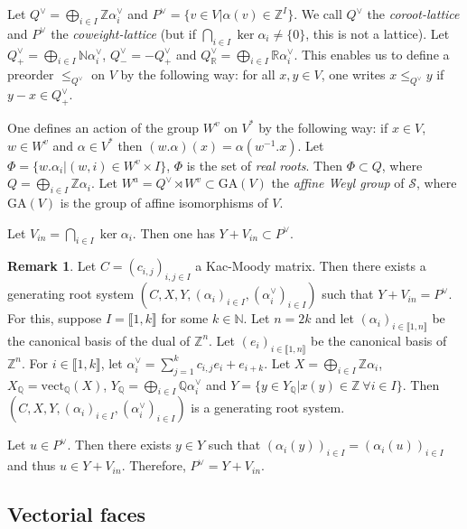 \documentclass[12pt]{article}
\theoremstyle{plain}
\theoremstyle{definition}
\newtheorem{rque}[thm]{Remark}
\newcommand{\R}{\mathbb{R}}
\newcommand{\N}{\mathbb{N}}
\newcommand{\Z}{\mathbb{Z}}
\newcommand{\Q}{\mathbb{Q}}
\begin{document}
Let  $Q^\vee=\bigoplus_{i\in I}\Z\alpha_i^\vee$ and $P^\vee=\{v\in V |\alpha(v)\in \Z^I\}$. We call  $Q^\vee$ the \textit{coroot-lattice} and $P^\vee$ the \textit{coweight-lattice} (but if $\bigcap_{i\in I}\ker \alpha_i\neq \{0\}$, this is not a lattice). Let $Q_+^\vee=\bigoplus_{i\in I}\N \alpha_i^\vee$, $Q^\vee_-=-Q^\vee_+$ and $Q^\vee_{\mathbb{R}}=\bigoplus_{i\in I}\R\alpha_i^\vee$. This enables us to define a preorder $\leq_{Q^\vee}$ on $V$ by the following way: for all $x,y\in V$, one writes $x\leq_{Q^\vee}y$ if $y-x\in Q^\vee_+$. 


One defines an action of the group $W^v$ on $V^*$ by the following way: if $x\in V$, $w\in W^v$ and $\alpha\in V^*$ then $(w.\alpha)(x)=\alpha(w^{-1}.x)$. Let $\Phi=\{w.\alpha_i|(w,i)\in W^v\times I\}$, $\Phi$ is the set of \textit{real roots}. Then $\Phi\subset Q$, where $Q=\bigoplus_{i\in I}\Z\alpha_i$. Let $W^a=Q^\vee\rtimes W^v\subset\mathrm{GA}(V\mathrm{})$ the \textit{affine Weyl group} of $\mathcal{S}$, where $\mathrm{GA}(V\mathrm{})$ is the group of affine isomorphisms of $V$.




Let $V_{in}=\bigcap_{i\in I}\ker \alpha_i$. Then one has $Y+V_{in}\subset P^\vee$. 


\begin{rque}\label{rque changement de syst de racines}
Let $C=(c_{i,j})_{i,j\in I}$ a Kac-Moody matrix. Then there exists a generating root system $(C,X,Y,(\alpha_i)_{i\in I},(\alpha_i^\vee)_{i\in I})$ such that $Y+V_{in}=P^\vee$. For this, suppose $I=\llbracket 1,k\rrbracket$ for some $k\in \N$. Let $n=2k$ and let $(\alpha_i)_{i\in \llbracket 1,n\rrbracket }$ be the canonical basis of the dual of $\Z^n$. Let $(e_i)_{i\in \llbracket 1,n\rrbracket }$ be the canonical basis of $\Z^n$. For $i\in \llbracket 1,k\rrbracket$, let $\alpha_i^\vee=\sum_{j=1}^k c_{i,j}e_i+e_{i+k}$. Let $X=\bigoplus_{i\in I}\Z\alpha_i$, $X_\Q=\mathrm{vect}_\Q(X)$, $Y_\Q=\bigoplus_{i\in I}\Q\alpha_i^\vee$ and $Y=\{y\in Y_\Q|x(y)\in \Z\ \forall i\in I\}$. Then $(C,X,Y,(\alpha_i)_{i\in I},(\alpha_i^\vee)_{i\in I})$ is a generating root system.

Let $u\in P^\vee$. Then there exists $y\in Y$ such that $(\alpha_i(y))_{i\in I}=(\alpha_i(u))_{i\in I}$ and thus $u\in Y+V_{in}$. Therefore, $P^\vee=Y+V_{in}$.

\end{rque}

\subsection{Vectorial faces}
\end{document}
